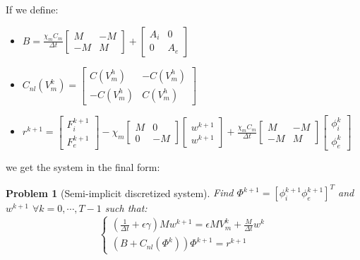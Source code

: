 \documentclass[a4paper,11pt]{article}
\newtheorem{problem}{Problem}
\begin{document}
\vspace{5mm}
\noindent If we define:
\begin{itemize}
\item $B=\frac{\chi_m C_m}{\Delta t} \begin{bmatrix} M &-M \\-M & M \end{bmatrix}+\begin{bmatrix} A_i & 0 \\ 0 & A_e \end{bmatrix}$
\item $C_{nl}(V_m^k)=\begin{bmatrix}C(V_m^h) & -C(V_m^h) \\ -C(V_m^h) & C(V_m^h) \end{bmatrix}$
\item $r^{k+1}=\begin{bmatrix} F_i^{k+1} \\ F_e^{k+1}\end{bmatrix}-\chi_m \begin{bmatrix}M & 0 \\ 0 & -M \end{bmatrix} \begin{bmatrix}w^{k+1} \\ w^{k+1} \end{bmatrix}+\frac{\chi_m C_m}{\Delta t} \begin{bmatrix} M &-M \\-M & M \end{bmatrix} \begin{bmatrix} \phi_i^k \\ \phi_e^k \end{bmatrix}$
\end{itemize} \vspace{5mm}
we get the system in the final form:  \\
\begin{problem}[Semi-implicit discretized system]
Find $\Phi^{k+1}=[\phi_i^{k+1} \phi_e^{k+1}]^T$ and $w^{k+1}$ $\forall k=0,\cdots,T-1$ such that:
\begin{equation*}
\begin{cases}
(\frac{1}{\Delta t}+\epsilon \gamma)M w^{k+1}=\epsilon M V_m^k+\frac{M}{\Delta t} w^k \\
(B+C_{nl}(\Phi^k)) \Phi^{k+1}=r^{k+1}
\end{cases}
\end{equation*} 
\end{problem}\vspace{4mm}
\end{document}
